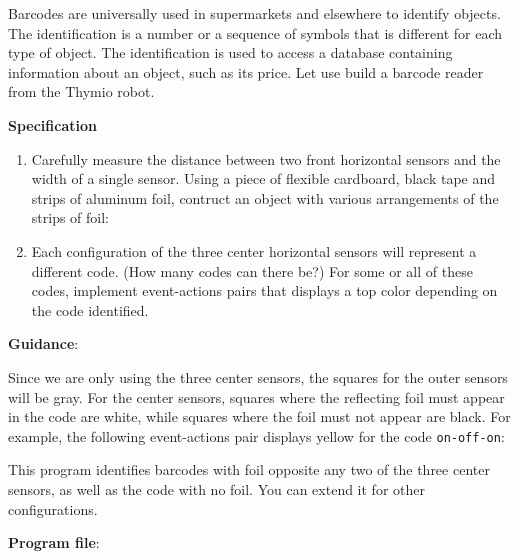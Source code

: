 
\label{ch.barcode}

Barcodes are universally used in supermarkets and elsewhere to identify
objects. The identification is a number or a sequence of symbols that is
different for each type of object. The identification is used to access
a database containing information about an object, such as its price.
Let use build a barcode reader from the Thymio robot.

\textbf{Specification}

\begin{enumerate}
\item Carefully measure the distance between two front horizontal
sensors and the width of a single sensor.
Using a piece of flexible cardboard, black tape and strips of aluminum
foil, contruct an object with various arrangements of the strips of foil:

\begin{center}
\end{center}

\item Each configuration of the three center horizontal sensors will
represent a different code. (How many codes can there be?) For some or
all of these codes, implement event-actions pairs that displays a top
color depending on the code identified.

\end{enumerate}

\textbf{Guidance}:

Since we are only using the three center sensors, the squares for the
outer sensors will be gray. For the center sensors, squares where the
reflecting foil must appear in the code are white, while squares where
the foil must not appear are black. For example, the following
event-actions pair displays yellow for the code \texttt{on-off-on}:


This program identifies barcodes with foil opposite any two of the three
center sensors, as well as the code with no foil. You can extend it for
other configurations. 

{\raggedleft \hfill \textbf{Program file}: }

